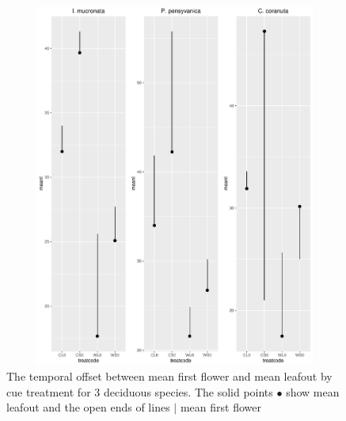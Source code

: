\documentclass{article}
\begin{document}
\begin{figure}[h!]
\includegraphics[width=14cm, height=12cm]{shrub_spread_graphs.pdf}
\caption[width=10cm]{The temporal offset between mean first flower and mean leafout by cue treatment for 3 deciduous species. The solid points 
$\bullet$
show mean leafout and the open ends of lines
$\mid$ 
mean first flower}
\end{figure}
\end{document}

